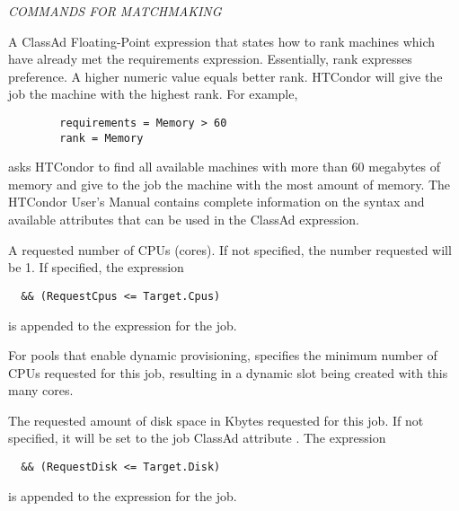 \emph{COMMANDS FOR MATCHMAKING}
\begin{description} 


\label{man-condor-submit-rank}
\item[rank = $<$ClassAd Float Expression$>$]
A ClassAd Floating-Point
expression that states how to rank machines which have already met the requirements
expression. Essentially, rank expresses preference.  A higher numeric value
equals better rank. HTCondor will give the job the machine with the
highest rank.  For example,
\begin{verbatim}
        requirements = Memory > 60
        rank = Memory
\end{verbatim}
asks HTCondor to find all available machines with more than 60 megabytes of memory
and give to the job the machine with the most amount of memory.
The HTCondor User's
Manual contains complete information on the syntax and available attributes
that can be used in the ClassAd expression.


\label{man-condor-submit-request-cpus}
\item[request\_cpus = $<$num-cpus$>$] 
A requested number of CPUs (cores).
If not specified, the number requested will be 1.
If specified, 
the expression
\begin{verbatim}
  && (RequestCpus <= Target.Cpus) 
\end{verbatim}
is appended to the  expression for the job.

For pools that enable
dynamic  provisioning,
specifies the minimum number of CPUs requested for this job,
resulting in a dynamic slot being created with this many cores.


\label{man-condor-submit-request-disk}
\item[request\_disk = $<$quantity$>$] 
The requested amount of disk space in Kbytes requested for this job.
If not specified, 
it will be set to the job ClassAd attribute .
The expression
\begin{verbatim}
  && (RequestDisk <= Target.Disk) 
\end{verbatim}
is appended to the  expression for the job.


\end{description}
